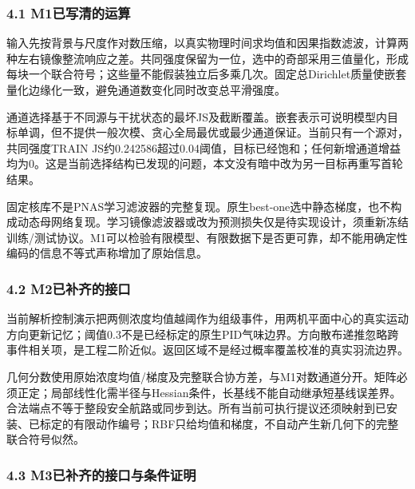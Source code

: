 \hypertarget{m1ux5df2ux5199ux6e05ux7684ux8fd0ux7b97}{%
\subsubsection{4.1
M1已写清的运算}\label{m1ux5df2ux5199ux6e05ux7684ux8fd0ux7b97}}

输入先按背景与尺度作对数压缩，以真实物理时间求均值和因果指数滤波，计算两种左右镜像整流响应之差。共同强度保留为一位，选中的奇部采用三值量化，形成每块一个联合符号；这些量不能假装独立后多乘几次。固定总Dirichlet质量使嵌套量化边缘化一致，避免通道数变化同时改变总平滑强度。

通道选择基于不同源与干扰状态的最坏JS及截断覆盖。嵌套表示可说明模型内目标单调，但不提供一般次模、贪心全局最优或最少通道保证。当前只有一个源对，共同强度TRAIN
JS约0.242586超过0.04阈值，目标已经饱和；任何新增通道增益均为0。这是当前选择结构已发现的问题，本文没有暗中改为另一目标再重写首轮结果。

固定核库不是PNAS学习滤波器的完整复现。原生best-one选中静态梯度，也不构成动态母网络复现。学习镜像滤波器或改为预测损失仅是待实现设计，须重新冻结训练/测试协议。M1可以检验有限模型、有限数据下是否更可靠，却不能用确定性编码的信息不等式声称增加了原始信息。

\hypertarget{m2ux5df2ux8865ux9f50ux7684ux63a5ux53e3}{%
\subsubsection{4.2
M2已补齐的接口}\label{m2ux5df2ux8865ux9f50ux7684ux63a5ux53e3}}

当前解析控制演示把两侧浓度均值越阈作为组级事件，用两机平面中心的真实运动方向更新记忆；阈值0.3不是已经标定的原生PID气味边界。方向散布递推忽略跨事件相关项，是工程二阶近似。返回区域不是经过概率覆盖校准的真实羽流边界。

几何分数使用原始浓度均值/梯度及完整联合协方差，与M1对数通道分开。矩阵必须正定；局部线性化需半径与Hessian条件，长基线不能自动继承短基线误差界。合法端点不等于整段安全航路或同步到达。所有当前可执行提议还须映射到已安装、已标定的有限动作编号；RBF只给均值和梯度，不自动产生新几何下的完整联合符号似然。

\hypertarget{m3ux5df2ux8865ux9f50ux7684ux63a5ux53e3ux4e0eux6761ux4ef6ux8bc1ux660e}{%
\subsubsection{4.3
M3已补齐的接口与条件证明}\label{m3ux5df2ux8865ux9f50ux7684ux63a5ux53e3ux4e0eux6761ux4ef6ux8bc1ux660e}}

